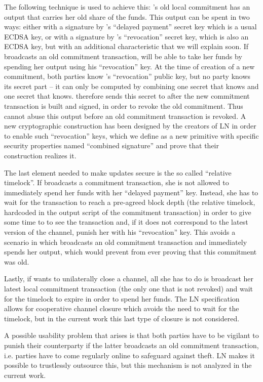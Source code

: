     The following technique is used to achieve this: \alice's old local
    commitment has an output that carries her old share of the funds. This
    output can be spent in two ways: either with a signature by \alice's
    ``delayed payment'' secret key which is a usual ECDSA key, or with a
    signature by \bob's ``revocation'' secret key, which is also an ECDSA key,
    but with an additional characteristic that we will explain soon. If \alice{}
    broadcasts an old commitment transaction, \bob{} will be able to take her
    funds by spending her output using his ``revocation'' key.  At the time of
    creation of a new commitment, both parties know \bob's ``revocation'' public
    key, but no party knows its secret part -- it can only be computed by
    combining one secret that \alice{} knows and one secret that \bob{} knows.
    \alice{} therefore sends this secret to \bob{} after the new commitment
    transaction is built and signed, in order to revoke the old commitment. Thus
    \bob{} cannot abuse this output before an old commitment transaction is
    revoked. A new cryptographic construction has been designed by the creators
    of LN in order to enable such ``revocation'' keys, which we define as a new
    primitive with specific security properties named ``combined signature'' and
    prove that their construction realizes it.

    The last element needed to make updates secure is the so called ``relative
    timelock''. If \alice{} broadcasts a commitment transaction, she is not
    allowed to immediately spend her funds with her ``delayed payment'' key.
    Instead, she has to wait for the transaction to reach a pre-agreed block
    depth (the relative timelock, hardcoded in the output script of the
    commitment transaction) in order to give some time to \bob{} to see the
    transaction and, if it does not correspond to the latest version of the
    channel, punish her with his ``revocation'' key. This avoids a scenario in
    which \alice{} broadcasts an old commitment transaction and immediately
    spends her output, which would prevent \bob{} from ever proving that this
    commitment was old.

    Lastly, if \alice{} wants to unilaterally close a channel, all she has to do
    is broadcast her latest local commitment transaction (the only one that is
    not revoked) and wait for the timelock to expire in order to spend her
    funds. The LN specification allows for cooperative channel closure which
    avoids the need to wait for the timelock, but in the current work
    this last type of closure is not considered.

    A possible usability problem that arises is that both parties have to be
    vigilant to punish their counterparty if the latter broadcasts an old
    commitment transaction, i.e. parties have to come regularly online to
    safeguard against theft. LN makes it possible to trustlessly outsource this,
    but this mechanism is not analyzed in the current work.
